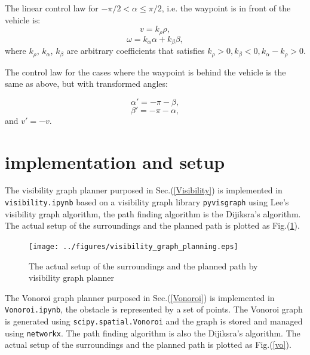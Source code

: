 \documentclass[12pt]{article}
\begin{document}
The linear control law for $-\pi/2<\alpha\le \pi/2$, i.e. the waypoint is in front of the vehicle is:
$$v=k_\rho \rho,$$
$$\omega=k_\alpha \alpha+k_\beta \beta,$$
where $k_\rho$, $k_\alpha$, $k_\beta$ are arbitrary coefficients that satisfies $k_\rho>0, k_\beta<0,k_\alpha-k_\rho>0.$

The control law for the cases where the waypoint is behind the vehicle is the same as above, but with transformed angles:

$$\alpha'=-\pi-\beta,$$
$$\beta'=-\pi-\alpha,$$
and $v'=-v$.

%


\section{implementation and setup}

The visibility graph planner purposed in Sec.(\ref{Visibility}) is implemented in \texttt{visibility.ipynb} based on a visibility graph library \texttt{pyvisgraph} using Lee's visibility graph algorithm, the path finding algorithm is the Dijiksra's algorithm. The actual setup of the surroundings and the planned path is plotted as Fig.(\ref{vis}).

\begin{figure}[htbp]
\centering
\texttt{[image: ../figures/visibility\_graph\_planning.eps]}
\caption{The actual setup of the surroundings and the planned path by visibility graph planner}\label{vis}
\end{figure}

The Vonoroi graph planner purposed in Sec.(\ref{Vonoroi}) is implemented in \texttt{Vonoroi.ipynb}, the obstacle is represented by a set of points. The Vonoroi graph is generated using \texttt{scipy.spatial.Vonoroi} and the graph is stored and managed using \texttt{networkx}. The path finding algorithm is also the Dijiksra's algorithm. The actual setup of the surroundings and the planned path is plotted as Fig.(\ref{vo}).
\end{document}
